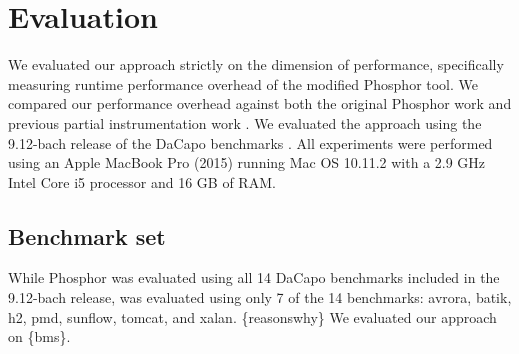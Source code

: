 \chapter{Evaluation}
We evaluated our approach strictly on the dimension of performance, specifically measuring runtime performance overhead of the modified Phosphor tool.  We compared our performance overhead against both the original Phosphor work \cite{phosphor_oopsla} and previous partial instrumentation work \cite{manoj_project}.  We evaluated the approach using the 9.12-bach release of the DaCapo benchmarks \cite{dacapobach}.  All experiments were performed using an Apple MacBook Pro (2015) running Mac OS 10.11.2 with a 2.9 GHz Intel Core i5 processor and 16 GB of RAM. 
\section{Benchmark set}
While Phosphor \cite{phosphor_oopsla} was evaluated using all 14 DaCapo benchmarks included in the 9.12-bach release, \cite{manoj_project} was evaluated using only 7 of the 14 benchmarks: avrora, batik, h2, pmd, sunflow, tomcat, and xalan. \{reasonswhy\}  We evaluated our approach on \{bms\}.
